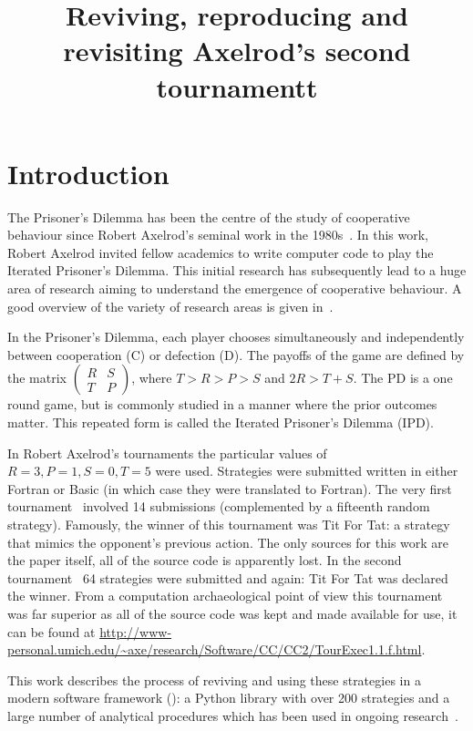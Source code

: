 \documentclass{article}
\title{Reviving, reproducing and revisiting Axelrod's second tournamentt}
\begin{document}
\maketitle

\section{Introduction}\label{sec:introduction}

The Prisoner's Dilemma has been the centre of the study of
cooperative behaviour since Robert Axelrod's seminal work in the
1980s~\cite{Axelrod1980a, Axelrod1980b, Axelrodbook}. In this work, Robert
Axelrod invited fellow academics to write computer code to play the Iterated
Prisoner's Dilemma. This initial research has subsequently lead to a huge area
of research aiming to understand the emergence of cooperative behaviour. A good
overview of the variety of research areas is given in~\cite{Nowak2006}.

In the Prisoner's Dilemma, each player chooses
simultaneously and independently
between cooperation (C) or defection (D). The payoffs of
the game are defined by the matrix
\(
\begin{pmatrix}
    R & S \\ 
    T & P
\end{pmatrix}
\),
where $T > R > P > S$ and $2R > T + S$. The PD is a one
round game, but is commonly studied in a manner where the prior outcomes
matter. This repeated form is called the Iterated Prisoner's
Dilemma (IPD).


In Robert Axelrod's tournaments the particular values of \(R=3, P=1, S=0, T=5\)
were used.  Strategies were submitted written in either Fortran or Basic
(in which case they were translated to Fortran). The very first
tournament~\cite{Axelrod1980a} involved 14 submissions  (complemented by a
fifteenth random strategy). Famously, the winner of this tournament was
Tit For Tat: a strategy that mimics the opponent's previous action. The only
sources for this work are the paper itself, all of the source code is apparently
lost. In the second tournament~\cite{Axelrod1980b} 64 strategies were submitted
and again: Tit For Tat was declared the winner. From a computation archaeological
point of view this tournament was far superior as all of the source code was
kept and made available for use, it can be found at
\url{http://www-personal.umich.edu/~axe/research/Software/CC/CC2/TourExec1.1.f.html}.

This work describes the process of reviving and using these strategies in a
modern software framework (\cite{AxelrodProject}): a Python library with over
200 strategies and a large number of analytical procedures which has been used
in ongoing research~\cite{Harper2017, Knight2017}.
\end{document}
